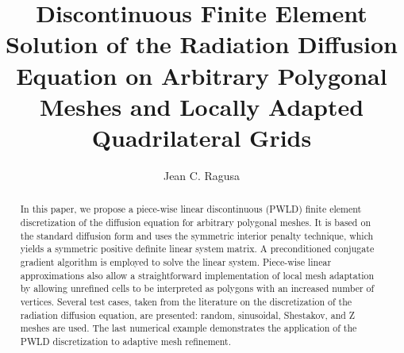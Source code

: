 \documentclass[preprint,10pt]{elsarticle}
\begin{document}
 

\begin{frontmatter}



\title{Discontinuous Finite Element Solution of the Radiation Diffusion Equation on Arbitrary Polygonal Meshes
and Locally Adapted Quadrilateral Grids}


\author{Jean C. Ragusa}
\address{Department of Nuclear Engineering, Texas A\&M University, College Station, TX 77843, USA}


\begin{abstract}

In this paper, we propose a piece-wise linear discontinuous (PWLD) finite element discretization of the diffusion equation for arbitrary 
polygonal meshes. It is based on the standard diffusion form and uses the symmetric interior penalty technique, which yields a 
symmetric positive definite linear system matrix. A preconditioned conjugate gradient algorithm is employed to solve the linear system. 
Piece-wise linear approximations also allow a straightforward implementation of local mesh adaptation by allowing unrefined cells to
be interpreted as polygons with an increased number of vertices.
Several test cases, taken from the literature on the discretization of the radiation diffusion equation, are presented: random, sinusoidal, 
Shestakov, and Z meshes are used. The last numerical example demonstrates the application of the PWLD discretization to adaptive 
mesh refinement.
 


\end{abstract}
\end{frontmatter}
\end{document}
